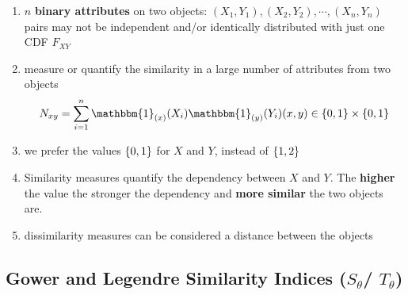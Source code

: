\begin{enumerate}
    \item $n$ \textbf{binary attributes} on two objects: $(X_1, Y_1), (X_2, Y_2), \cdots , (X_n, Y_n)$ \\
    pairs may not be independent and/or identically distributed with just one CDF $F_{XY}$

    \item measure or quantify the similarity in a large number of attributes from two objects
    \[
        N_{xy}
        = \dsum_{i=1}^{n} 
        \mathbbm{1}_{(x)}(X_i)
        \mathbbm{1}_{(y)}(Y_i)
        \hfill
        (x,y) \in \dCurlyBrac{0,1} \times \dCurlyBrac{0,1}
    \]

    \item we prefer the values $\left\{0, 1\right\}$ for $X$ and $Y$, instead of $\left\{1, 2\right\}$

    \item Similarity measures quantify the dependency between $X$ and $Y$. The \textbf{higher} the value the stronger the dependency and \textbf{more similar} the two objects are.

    \item dissimilarity measures can be considered a distance between the objects
\end{enumerate}

\subsection{Gower and Legendre Similarity Indices ($S_\theta$/ $T_\theta$) \cite{ism-1}} \label{Gower and Legendre Similarity Indices}

